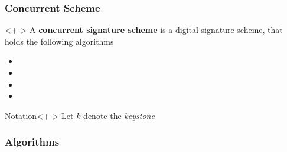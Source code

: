 \begin{frame}
	\frametitle{Concurrent Scheme}

	\begin{definition}<+->
		A \textbf{concurrent signature scheme} is a digital signature scheme, that holds the following algorithms
		\begin{itemize}
			\item \setup
			\item \asign
			\item \averify
			\item \verify
		\end{itemize}
	\end{definition}

  \begin{block}{Notation}<+->
    Let $k$ denote the \textit{keystone}
	\end{block}
\end{frame}

\begin{frame}
	\frametitle{Algorithms}

  \begin{center}	
	\end{center}

\end{frame}

